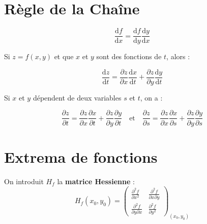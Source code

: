 \documentclass[french]{yLectureNote}
\newcommand{\dd}{\mathrm{d}}
\begin{document}
\section{Règle de la Chaîne}
\begin{theorem}
\[\frac{\dd f}{\dd x} = \frac{\dd f}{\dd y}\frac{\dd y}{\dd x}\]
\end{theorem}
Si $z = f(x,y)$ et que $x$ et $y$ sont des fonctions de $t$, alors :
\begin{theorem}
\[ \frac{\dd z}{\dd t} = \frac{\partial z}{\partial x} \frac{\dd x}{\dd t} + \frac{\partial z}{\partial y} \frac{\dd y}{\dd t} \]
\end{theorem}
Si $x$ et $y$ dépendent de deux variables $s$ et $t$, on a :
\begin{theorem}
\[ \frac{\partial z}{\partial t} = \frac{\partial z}{\partial x} \frac{\partial x}{\partial t} + \frac{\partial z}{\partial y} \frac{\partial y}{\partial t} \quad \text{et} \quad \frac{\partial z}{\partial s} = \frac{\partial z}{\partial x} \frac{\partial x}{\partial s} + \frac{\partial z}{\partial y} \frac{\partial y}{\partial s} \]
\end{theorem}
\section{Extrema de fonctions}
On introduit $H_f$ la \textbf{matrice Hessienne} :
\[ H_f(x_0,y_0) = \begin{pmatrix} \frac{\partial^2 f}{\partial x^2} & \frac{\partial^2 f}{\partial x \partial y} \\ \frac{\partial^2 f}{\partial y \partial x} & \frac{\partial^2 f}{\partial y^2} \end{pmatrix}_{(x_0,y_0)} \]
\end{document}
